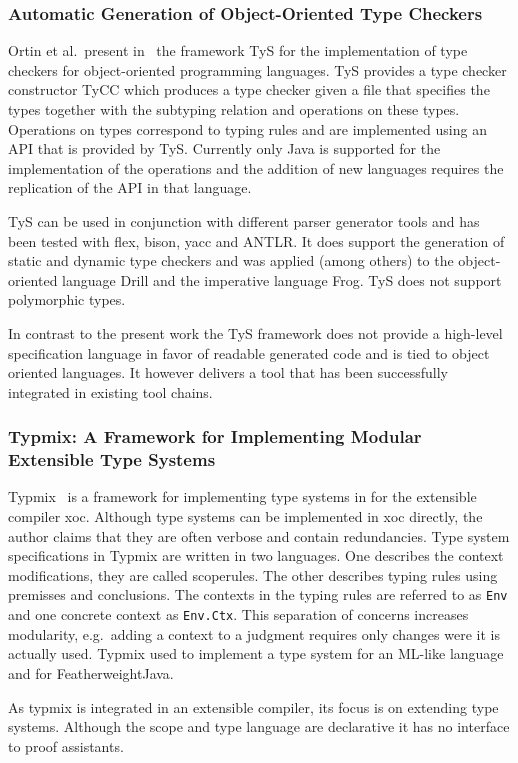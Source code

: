 \subsubsection{Automatic Generation of Object-Oriented Type Checkers}
Ortin et al.\ present in~\cite{ortin2014automatic} the framework TyS
for the implementation of type checkers for object-oriented
programming languages. TyS provides a type checker constructor TyCC
which produces a type checker given a file that specifies the types
together with the subtyping relation and operations on these
types. Operations on types correspond to typing rules and are
implemented using an API that is provided by TyS. Currently only Java
is supported for the implementation of the operations and the addition
of new languages requires the replication of the API in that
language.

TyS can be used in conjunction with different parser generator tools
and has been tested with flex, bison, yacc and ANTLR. It does support
the generation of static and dynamic type checkers and was applied
(among others) to the object-oriented language Drill and the
imperative language Frog. TyS does not support polymorphic types.

In contrast to the present work the TyS framework does not provide a
high-level specification language in favor of readable generated code
and is tied to object oriented languages. It however delivers a tool
that has been successfully integrated in existing tool chains.
\subsubsection{Typmix: A Framework for Implementing Modular Extensible Type
  Systems}
Typmix~\cite{bergan2007typmix} is a framework for implementing type
systems in for the extensible compiler xoc. Although type systems can
be implemented in xoc directly, the author claims that they are often
verbose and contain redundancies. Type system specifications in Typmix
are written in two languages. One describes the context modifications,
they are called scoperules. The other describes typing rules using
premisses and conclusions. The contexts in the typing rules are
referred to as \verb|Env| and one concrete context as
\verb|Env.Ctx|. This separation of concerns increases modularity,
e.g.\ adding a context to a judgment requires only changes were it is
actually used. Typmix used to implement a type system for an ML-like
language and for FeatherweightJava.

As typmix is integrated in an extensible compiler, its focus is on
extending type systems. Although the scope and type language are
declarative it has no interface to proof assistants.

